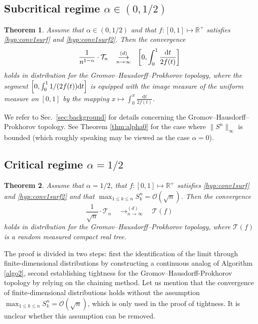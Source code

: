 \documentclass[11pt]{article}
\theoremstyle{plain}
\newtheorem{theorem}{Theorem}[section]
\theoremstyle{definition}
\theoremstyle{remark}
\newcommand{\R}{\mathbb{R}} %
\newcommand{\1}{\mathbbm{1}} %
\newcommand{\T}{\mathcal{T}} %
\let\originalleft\left
\let\originalright\right
\renewcommand{\left}{\mathopen{}\mathclose\bgroup\originalleft}
\renewcommand{\right}{\aftergroup\egroup\originalright}
\begin{document}
 
\subsection{Subcritical regime \texorpdfstring{$\alpha \in (0,1/2)$}{}}
 

\begin{theorem}
\label{thm:sous-critique}
Assume that $\alpha\in{(0,1/2)}$ and that $f:[0,1]\mapsto \R^+$ satisfies \ref{hyp:conv1surf} and \ref{hyp:conv1surf2}. Then the convergence
\[
\frac{1}{n^{1-\alpha}} \cdot \T_{n}  \quad \mathop{\longrightarrow}^{(d)}_{n \rightarrow \infty} \quad \left[ 0, \int_0^1\frac{\mathrm{d}t}{2f(t)} \right]
\]
holds in distribution for the Gromov--Hausdorff--Prokhorov topology, where the segment $\left[ 0, \int_0^1 1/(2f(t)) {\mathrm{d}t}  \right]$ is equipped with the image measure of the uniform measure on $[0,1]$ by the mapping $x\mapsto \int_0^x\frac{\mathrm{d}t}{2f(t)}$.
\end{theorem}

We refer to Sec.~\ref{sec:background} for details concerning the  Gromov--Hausdorff--Prokhorov topology. See Theorem \ref{thm:alpha0} for the case  where $\| S^{n} \|_{\infty}$ is bounded (which roughly speaking may be viewed as the case $\alpha=0$).

  
  \subsection{Critical regime \texorpdfstring{$\alpha=1/2$}{}}


\begin{theorem}
\label{thm:critique}
Assume that $\alpha=1/2$, that $f:[0,1]\mapsto \R^+$ satisfies  \ref{hyp:conv1surf} and \ref{hyp:conv1surf2} and that $\max_{1 \leq  k \leq n} S^{n}_{k}= \mathcal{O}(\sqrt{n})$. Then the convergence
\[\frac{1}{\sqrt{n}} \cdot \T_{n}  \quad \mathop{\longrightarrow}^{(d)}_{n \rightarrow \infty} \quad \mathcal{T}(f)\]
holds in distribution for the Gromov--Hausdorff--Prokhorov topology, where $\mathcal{T}(f)$ is a random measured compact real tree.
\end{theorem}

The proof is divided in two steps: first the identification of the limit through finite-dimensional distributions by constructing a continuous analog of Algorithm \ref{algo2}, second establishing tightness for the Gromov--Hausdorff-Prokhorov topology by relying on the  chaining method.  {Let us mention that the convergence of finite-dimensional distributions holds without the assumption $\max_{1 \leq  k \leq n} S^{n}_{k}= \mathcal{O}(\sqrt{n})$, which is only used in the proof of tightness. It is unclear whether this assumption can be removed.}
\end{document}
